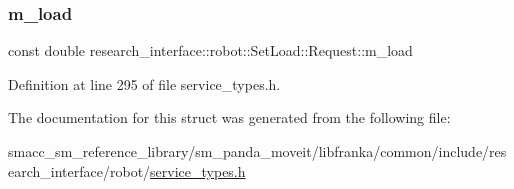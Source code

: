 \subsubsection{\texorpdfstring{m\+\_\+load}{m\_load}}
{\footnotesize\ttfamily const double research\+\_\+interface\+::robot\+::\+Set\+Load\+::\+Request\+::m\+\_\+load}



Definition at line 295 of file service\+\_\+types.\+h.



The documentation for this struct was generated from the following file\+:\begin{DoxyCompactItemize}
\item 
smacc\+\_\+sm\+\_\+reference\+\_\+library/sm\+\_\+panda\+\_\+moveit/libfranka/common/include/research\+\_\+interface/robot/\hyperlink{service__types_8h}{service\+\_\+types.\+h}\end{DoxyCompactItemize}
